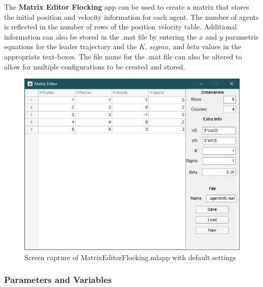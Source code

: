 \documentclass[../CourseManual.tex]{subfiles}
\begin{document}
The \textbf{Matrix Editor Flocking} app can be used to create a matrix that stores the initial position and velocity information for each agent. The number of agents is reflected in the number of rows of the position velocity table. Additional information can also be stored in the .mat file by entering the $x$ and $y$ parametric equations for the leader trajectory and the $K$, $sigma$, and $beta$ values in the appropriate text-boxes. The file name for the .mat file can also be altered to allow for multiple configurations to be created and stored.

\begin{figure}[H]
    \centering
    \includegraphics[width=350pt]{media/MatrixEditorFlocking.JPG}
    \caption{Screen capture of MatrixEditorFlocking.mlapp with default settings}
    \label{fig: matrix editor flocking}
\end{figure}

\subsubsection{Parameters and Variables}
\end{document}
